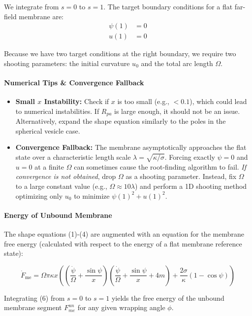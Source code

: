 \documentclass[11pt]{article}
\begin{document}
We integrate from $s=0$ to $s=1$. The target boundary conditions for a flat far-field membrane are:
\begin{align*}
\psi(1) &= 0 \\
u(1) &= 0
\end{align*}

Because we have two target conditions at the right boundary, we require two shooting parameters: the initial curvature $u_0$ and the total arc length $\Omega$. 

\paragraph{Numerical Tips \& Convergence Fallback}
\begin{itemize}
    \item \textbf{Small $x$ Instability:} Check if $x$ is too small (e.g., $< 0.1$), which could lead to numerical instabilities. If $R_{pa}$ is large enough, it should not be an issue. Alternatively, expand the shape equation similarly to the poles in the spherical vesicle case.
    \item \textbf{Convergence Fallback:} The membrane asymptotically approaches the flat state over a characteristic length scale $\lambda = \sqrt{\kappa/\sigma}$. Forcing exactly $\psi=0$ and $u=0$ at a finite $\Omega$ can sometimes cause the root-finding algorithm to fail. \textit{If convergence is not obtained}, drop $\Omega$ as a shooting parameter. Instead, fix $\Omega$ to a large constant value (e.g., $\Omega \approx 10\lambda$) and perform a 1D shooting method optimizing only $u_0$ to minimize $\psi(1)^2 + u(1)^2$.
\end{itemize}

\paragraph{Energy of Unbound Membrane}
The shape equations (1)-(4) are augmented with an equation for the membrane free energy (calculated with respect to the energy of a flat membrane reference state):

\begin{equation}
\dot{F}_{\text{me}} = \Omega \pi \kappa x \left( \left( \frac{\dot{\psi}}{\Omega} + \frac{\sin \psi}{x} \right)  \left( \frac{\dot{\psi}}{\Omega} +  \frac{\sin \psi}{x} + 4m \right) + \frac{2 \sigma}{\kappa} (1 - \cos \psi) \right)
\end{equation}

Integrating (6) from $s = 0$ to $s = 1$ yields the free energy of the unbound membrane segment $F_{me}^{un}$ for any given wrapping angle $\phi$.
\end{document}
